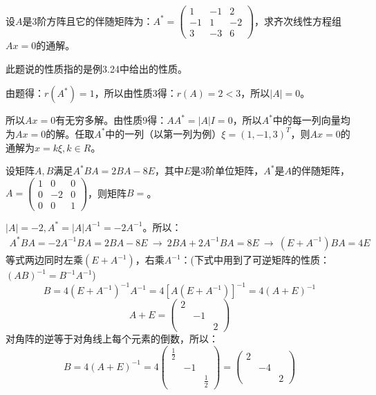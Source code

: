 \documentclass[a4paper]{report}
\begin{document}
\EX 设$A$是3阶方阵且它的伴随矩阵为：$A^*=
\begin{pmatrix}
1&-1&2\\
-1&1&-2\\
3&-3&6
\end{pmatrix}$，求齐次线性方程组$Ax=0$的通解。

\begin{jie}
此题说的性质指的是例3.24中给出的性质。

由题得：$r(A^*)=1$，所以由性质3得：$r(A)=2<3$，所以$|A|=0$。

所以$Ax=0$有无穷多解。由性质9得：$AA^*=|A|I=0$，所以$A^*$中的每一列向量均为$Ax=0$的解。任取$A^*$中的一列（以第一列为例）$\xi=(1,-1,3)^T$，则$Ax=0$的通解为$x=k\xi,k\in R$。
\end{jie}

\EX 设矩阵$A,B$满足$A^*BA=2BA-8E$，其中$E$是3阶单位矩阵，$A^*$是$A$的伴随矩阵，$
A=
\begin{pmatrix}
1&0&0\\
0&-2&0\\
0&0&1
\end{pmatrix}
$，则矩阵$B=$\underline{\hphantom{~~~~~~~~}}。

\begin{jie}
$|A|=-2,A^*=|A|A^{-1}=-2A^{-1}$。所以：
\begin{align*}
A^*BA=-2A^{-1}BA=2BA-8E~\rightarrow~2BA+2A^{-1}BA=8E~\rightarrow~(E+A^{-1})BA=4E
\end{align*}
等式两边同时左乘$(E+A^{-1})$，右乘$A^{-1}$：(下式中用到了可逆矩阵的性质：$(AB)^{-1}=B^{-1}A^{-1}$)
\begin{equation*}
B=4(E+A^{-1})^{-1}A^{-1}=4[A(E+A^{-1})]^{-1}=4(A+E)^{-1}
\end{equation*}
\begin{equation*}
A+E=
\begin{pmatrix}
2\\
&-1\\
&&2
\end{pmatrix}
\end{equation*}
对角阵的逆等于对角线上每个元素的倒数，所以：
\begin{equation*}
B=4(A+E)^{-1}=4
\begin{pmatrix}
\frac{1}{2}\\
&-1\\
&&\frac{1}{2}
\end{pmatrix}=
\begin{pmatrix}
2\\
&-4\\
&&2
\end{pmatrix}
\end{equation*}
\end{jie}
\end{document}
